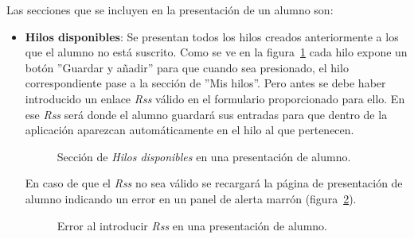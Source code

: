 \documentclass[a4paper, 12pt]{book}
\begin{document}
Las secciones que se incluyen en la presentaci\'on de un alumno son:

\begin{itemize}
  \item {\bfseries Hilos disponibles}: Se presentan todos los hilos creados anteriormente a los que el alumno no est\'a suscrito. Como se ve en la 
  figura~\ref{figura:alumno1} cada hilo expone un bot\'on ''Guardar y a\~nadir'' para que cuando sea presionado, el hilo correspondiente pase a la 
  secci\'on de ''Mis hilos''. Pero antes se debe haber introducido un enlace \textit{Rss} v\'alido en el formulario proporcionado para ello. En ese 
  \textit{Rss} ser\'a donde el alumno guardar\'a sus entradas para que dentro de la aplicaci\'on aparezcan autom\'aticamente en el hilo al que pertenecen.
  \begin{figure}[htbp] 
    \centering
    \caption{Secci\'on de \textit{Hilos disponibles} en una presentaci\'on de alumno.}
    \label{figura:alumno1}
  \end{figure}
  
  En caso de que el \textit{Rss} no sea v\'alido se recargar\'a la p\'agina de presentaci\'on de alumno indicando un error en un panel de alerta marr\'on 
  (figura~\ref{figura:alumno2}).
  \begin{figure}[htbp] 
    \centering
    \caption{Error al introducir \textit{Rss} en una presentaci\'on de alumno.}
    \label{figura:alumno2}
  \end{figure}
  

\end{itemize}
\end{document}
